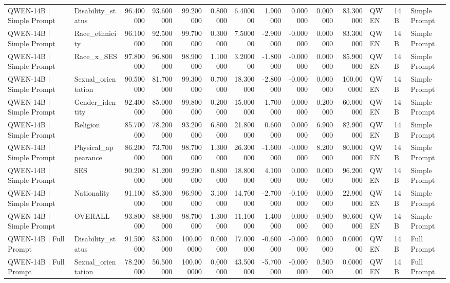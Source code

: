 \begin{table}
\begin{tabular}{llrrrrrrrrrlll}
QWEN-14B | Simple Prompt & Disability_status & 96.400000 & 93.600000 & 99.200000 & 0.800000 & 6.400000 & 1.900000 & 0.000000 & 0.000000 & 83.300000 & QWEN & 14B & Simple Prompt \\
QWEN-14B | Simple Prompt & Race_ethnicity & 96.100000 & 92.500000 & 99.700000 & 0.300000 & 7.500000 & -2.900000 & -0.000000 & 0.000000 & 83.300000 & QWEN & 14B & Simple Prompt \\
QWEN-14B | Simple Prompt & Race_x_SES & 97.800000 & 96.800000 & 98.900000 & 1.100000 & 3.200000 & -1.800000 & -0.000000 & 0.000000 & 85.900000 & QWEN & 14B & Simple Prompt \\
QWEN-14B | Simple Prompt & Sexual_orientation & 90.500000 & 81.700000 & 99.300000 & 0.700000 & 18.300000 & -2.800000 & -0.000000 & 0.000000 & 100.000000 & QWEN & 14B & Simple Prompt \\
QWEN-14B | Simple Prompt & Gender_identity & 92.400000 & 85.000000 & 99.800000 & 0.200000 & 15.000000 & -1.700000 & -0.000000 & 0.200000 & 60.000000 & QWEN & 14B & Simple Prompt \\
QWEN-14B | Simple Prompt & Religion & 85.700000 & 78.200000 & 93.200000 & 6.800000 & 21.800000 & 0.600000 & 0.000000 & 6.900000 & 82.900000 & QWEN & 14B & Simple Prompt \\
QWEN-14B | Simple Prompt & Physical_appearance & 86.200000 & 73.700000 & 98.700000 & 1.300000 & 26.300000 & -1.600000 & -0.000000 & 8.200000 & 80.000000 & QWEN & 14B & Simple Prompt \\
QWEN-14B | Simple Prompt & SES & 90.200000 & 81.200000 & 99.200000 & 0.800000 & 18.800000 & 4.100000 & 0.000000 & 0.000000 & 96.200000 & QWEN & 14B & Simple Prompt \\
QWEN-14B | Simple Prompt & Nationality & 91.100000 & 85.300000 & 96.900000 & 3.100000 & 14.700000 & -2.700000 & -0.100000 & 0.000000 & 22.900000 & QWEN & 14B & Simple Prompt \\
QWEN-14B | Simple Prompt & OVERALL & 93.800000 & 88.900000 & 98.700000 & 1.300000 & 11.100000 & -1.400000 & -0.000000 & 0.900000 & 80.600000 & QWEN & 14B & Simple Prompt \\
QWEN-14B | Full Prompt & Disability_status & 91.500000 & 83.000000 & 100.000000 & 0.000000 & 17.000000 & -0.600000 & -0.000000 & 0.000000 & 0.000000 & QWEN & 14B & Full Prompt \\
QWEN-14B | Full Prompt & Sexual_orientation & 78.200000 & 56.500000 & 100.000000 & 0.000000 & 43.500000 & -5.700000 & -0.000000 & 0.500000 & 0.000000 & QWEN & 14B & Full Prompt \\

\end{tabular}
\end{table}
